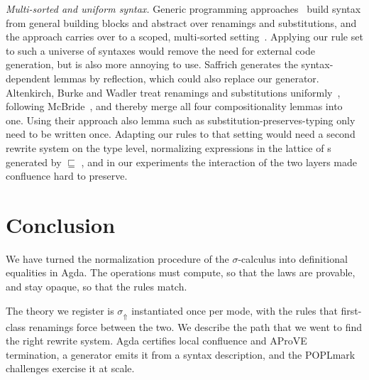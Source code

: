 \documentclass[sigplan,anonymous,review]{acmart}
\theoremstyle{acmdefinition}
\begin{document}
\emph{Multi-sorted and uniform syntax.} Generic programming
approaches~\cite{allais2021typescopesafeuniverse, 10.1145/3018610.3018613}
build syntax from general building blocks and abstract over renamings and
substitutions, and the approach carries over to a scoped, multi-sorted
setting~\cite{saffrich:LIPIcs.ITP.2024.32}. Applying our rule set to such a
universe of syntaxes would remove the need for external code generation, but
is also more annoying to use. Saffrich generates the syntax-dependent lemmas
by reflection, which could also replace our generator. Altenkirch, Burke and
Wadler treat renamings and substitutions
uniformly~\cite{altenkirch2025substitution}, following McBride~\cite{ren-sub},
and thereby merge all four compositionality lemmas into one.
Using their approach also lemma such as substitution-preserves-typing only need to be written once.
Adapting our
rules to that setting would need a second rewrite system on the type level,
normalizing expressions in the lattice of s generated by
 $\sqsubseteq$ , and
in our experiments the interaction of the two layers made confluence hard to
preserve.%

\section{Conclusion}\label{sec:con}

We have turned the normalization procedure of the $σ$-calculus into
definitional equalities in Agda. The operations must compute, so that the laws
are provable, and stay opaque, so that the rules match.

The theory we register is $σ_\Uparrow$ instantiated once per mode, with the
rules that first-class renamings force between the two. We describe the path that we went to find the right rewrite system. Agda certifies local confluence and AProVE
termination, a generator emits it from a syntax description, and the POPLmark
challenges exercise it at scale.

 
\end{document}
